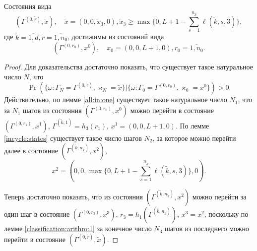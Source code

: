 \begin{lemma}
Состояния вида 
\begin{equation*}
    (\Gamma^{(0,  \tilde{r})},  \tilde{x}),  \quad 
\tilde{x}=(0,  0,  \tilde{x}_3, 0),  \tilde{x}_3 \geqslant \max{\{0,  L+1-\sum_{s=1}^{n_{\tilde{k}}} \ell(\tilde{k},  s,  3)\}}, 
\end{equation*}
где $\tilde{k}=\overline{1,  d},  \tilde{r} = \overline{1,  n_0}$,  достижимы из состояний вида 
\begin{equation*}
(\Gamma^{(0,  r_0)},  x^0),  \quad x_0=(0,  0,  L+1,  0),  r_0=\overline{1,  n_0}.
\end{equation*}
\label{classification:arithm:4}
\end{lemma}
\begin{proof}
Для доказательства достаточно показать,  что существует такое натуральное число $N$,  что 
\begin{equation*}
\Pr(\{\omega\colon \Gamma_{N}=\Gamma^{(0,  \tilde{r} )},  \varkappa_{N}=\tilde{x}\}|\{\omega\colon 
\Gamma_{0}=\Gamma^{(0,  r_0)},  \varkappa_{0}=x^0\})>0.
\end{equation*}
Действительно,  по лемме \ref{all:in:one} существует такое натуральное число $N_1$,  что за $N_1$ шагов из состояния $(\Gamma^{(0,  r_0)},  x^0)$ можно перейти в состояние  $(\Gamma^{(0,  r_1)},  x^1)$,  $\Gamma^{(\tilde{k},  1)}=h_3(r_1)$,  $x^1=(0,  0,  L+1,  0)$. По лемме \ref{incycle:states} существует такое число шагов $N_2$,  за которое можно перейти далее в состояние $(\Gamma^{(\tilde{k},  n_{\tilde{k}})},  x^2)$,  
\begin{equation*}
x^2=(0,  0,  \max{\{0,  L+1-\sum_{s=1}^{n_{\tilde{k}}} \ell(\tilde{k},  s,  3)\}},  0).
\end{equation*}

Теперь достаточно показать,  что из состояния $(\Gamma^{(\tilde{k},  n_{\tilde{k}})},  x^2)$ можно перейти за один шаг в состояние $(\Gamma^{(0,  r_3)},  x^3)$,  $r_3=h_1(\Gamma^{(\tilde{k},  n_{\tilde{k}})})$,  $x^3=x^2$,  поскольку по лемме \ref{classification:arithm:1} за конечное число $N_3$ шагов из последнего можно перейти в состояние $(\Gamma^{(0,  \tilde{r})},  \tilde{x})$.


\end{proof}
